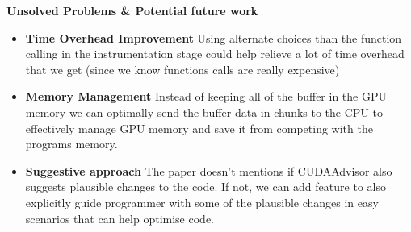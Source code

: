 \documentclass[a4paper]{article}
\begin{document}
\vspace{1.0cm}
{\bf\Large Unsolved Problems \& Potential future work} \\
\begin{itemize}
\item {\bf Time Overhead Improvement} Using alternate choices than the function calling in the instrumentation stage could help relieve a lot of time overhead that we get (since we know functions calls are really expensive)
\item {\bf Memory Management} Instead of keeping all of the buffer in the GPU memory we can optimally send the buffer data in chunks to the CPU to effectively manage GPU memory and save it from competing with the programs memory.
\item {\bf Suggestive approach} The paper doesn't mentions if CUDAAdvisor also suggests plausible changes to the code. If not, we can add feature to also explicitly guide programmer with some of the plausible changes in easy scenarios that can help optimise code.
\end{itemize}
\end{document}
